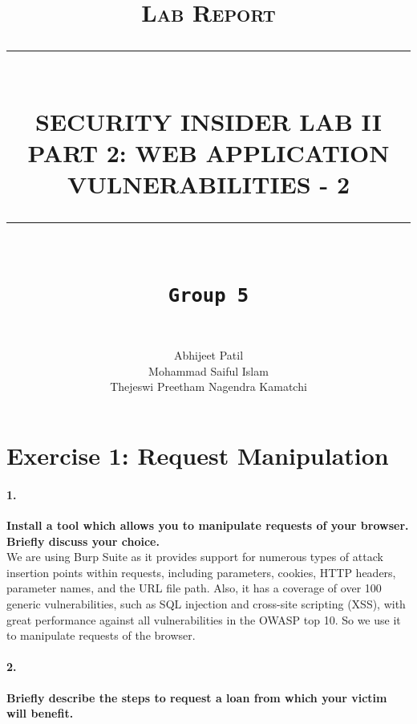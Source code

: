 \documentclass[12pt]{report}
\newcommand{\HRule}[1]{\rule{\linewidth}{#1}}
\begin{document}
	
	\title{ \normalsize \textsc{Lab Report}
		\\ [2.0cm]
		\HRule{0.5pt} \\
		\LARGE \textbf{\uppercase{Security Insider Lab II \\
				Part 2: Web Application Vulnerabilities - 2}}
		\HRule{2pt} \\ [0.5cm]
		\normalsize \vspace*{4\baselineskip}
		\LARGE {\tt Group 5}\\}
	\date{}
	\author{
		 \\
		Abhijeet Patil \\
		Mohammad Saiful Islam\\
		Thejeswi Preetham Nagendra Kamatchi}
	\maketitle
	\newpage
	
	
	
	
	\section*{Exercise 1: Request Manipulation}
	
	
	\paragraph*{1.} {\bf Install a tool which allows you to manipulate requests of your browser. Briefly discuss your choice.}\\ 
	We are using Burp Suite as it provides support for numerous types of attack insertion points within requests, including parameters, cookies, HTTP headers, parameter names, and the URL file path. Also, it has a  coverage of over 100 generic vulnerabilities, such as SQL injection and cross-site scripting (XSS), with great performance against all vulnerabilities in the OWASP top 10. So we use it to manipulate requests of the browser.
	
	\paragraph*{2.} {\bf Briefly describe the steps to request a loan from which your victim will benefit.}\\
	
\end{document}
